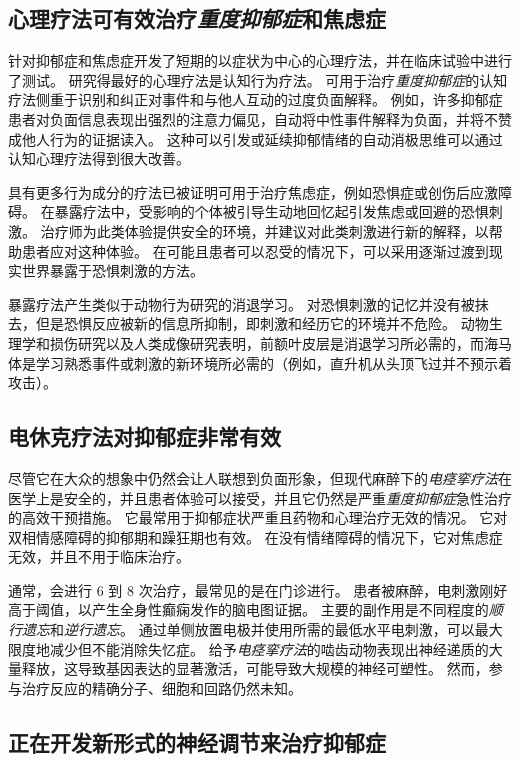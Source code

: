 \subsection{心理疗法可有效治疗\textit{重度抑郁症}和焦虑症}

针对抑郁症和焦虑症开发了短期的以症状为中心的心理疗法，并在临床试验中进行了测试。
研究得最好的心理疗法是认知行为疗法。
可用于治疗\textit{重度抑郁症}的认知疗法侧重于识别和纠正对事件和与他人互动的过度负面解释。
例如，许多抑郁症患者对负面信息表现出强烈的注意力偏见，自动将中性事件解释为负面，并将不赞成他人行为的证据读入。
这种可以引发或延续抑郁情绪的自动消极思维可以通过认知心理疗法得到很大改善。


具有更多行为成分的疗法已被证明可用于治疗焦虑症，例如恐惧症或创伤后应激障碍。
在暴露疗法中，受影响的个体被引导生动地回忆起引发焦虑或回避的恐惧刺激。
治疗师为此类体验提供安全的环境，并建议对此类刺激进行新的解释，以帮助患者应对这种体验。
在可能且患者可以忍受的情况下，可以采用逐渐过渡到现实世界暴露于恐惧刺激的方法。


暴露疗法产生类似于动物行为研究的消退学习。
对恐惧刺激的记忆并没有被抹去，但是恐惧反应被新的信息所抑制，即刺激和经历它的环境并不危险。
动物生理学和损伤研究以及人类成像研究表明，前额叶皮层是消退学习所必需的，而海马体是学习熟悉事件或刺激的新环境所必需的（例如，直升机从头顶飞过并不预示着攻击）。



\subsection{电休克疗法对抑郁症非常有效}

尽管它在大众的想象中仍然会让人联想到负面形象，但现代麻醉下的\textit{电痉挛疗法}在医学上是安全的，并且患者体验可以接受，并且它仍然是严重\textit{重度抑郁症}急性治疗的高效干预措施。
它最常用于抑郁症状严重且药物和心理治疗无效的情况。
它对双相情感障碍的抑郁期和躁狂期也有效。
在没有情绪障碍的情况下，它对焦虑症无效，并且不用于临床治疗。


通常，会进行 6 到 8 次治疗，最常见的是在门诊进行。
患者被麻醉，电刺激刚好高于阈值，以产生全身性癫痫发作的脑电图证据。
主要的副作用是不同程度的\textit{顺行遗忘}和\textit{逆行遗忘}。
通过单侧放置电极并使用所需的最低水平电刺激，可以最大限度地减少但不能消除失忆症。
给予\textit{电痉挛疗法}的啮齿动物表现出神经递质的大量释放，这导致基因表达的显著激活，可能导致大规模的神经可塑性。
然而，参与治疗反应的精确分子、细胞和回路仍然未知。



\subsection{正在开发新形式的神经调节来治疗抑郁症}

